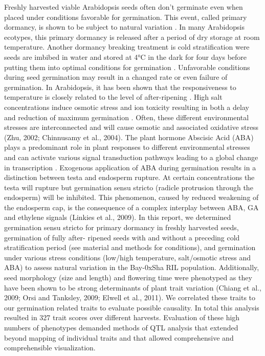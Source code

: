 Freshly harvested viable Arabidopsis seeds often don't germinate even when placed under conditions 
favorable for germination. This event, called primary dormancy, is shown to be subject to natural 
variation \cite{Bentsink:2010}. In many Arabidopsis ecotypes, this primary dormancy is released after 
a period of dry storage at room temperature. Another dormancy breaking treatment is cold stratification 
were seeds are imbibed in water and stored at 4°C in the dark for four days before putting them into 
optimal conditions for germination \cite{Finch-Savage:2006}. Unfavorable conditions during seed 
germination may result in a changed rate or even failure of germination. In Arabidopsis, it has been 
shown that the responsiveness to temperature is closely related to the level of after-ripening 
\cite{Tamura:2006}. High salt concentrations induce osmotic stress and ion toxicity resulting in both 
a delay and reduction of maximum germination \cite{Galpaz:2010}. Often, these different environmental 
stresses are interconnected and will cause osmotic and associated oxidative stress (Zhu, 2002; 
Chinnusamy et al., 2004). The plant hormone Abscisic Acid (ABA) plays a predominant role in plant 
responses to different environmental stresses and can activate various signal transduction pathways 
leading to a global change in transcription \cite{Finkelstein:2002, Xiong:2002}. Exogenous application 
of ABA during germination results in a distinction between testa and endosperm rupture. At certain 
concentrations the testa will rupture but germination sensu stricto (radicle protrusion through the 
endosperm) will be inhibited. This phenomenon, caused by reduced weakening of the endosperm cap, is 
the consequence of a complex interplay between ABA, GA and ethylene signals (Linkies et al., 2009). 
In this report, we determined germination sensu stricto for primary dormancy in freshly harvested seeds, 
germination of fully after- ripened seeds with and without a preceding cold stratification period 
(see material and methods for conditions), and germination under various stress conditions (low/high 
temperature, salt/osmotic stress and ABA) to assess natural  variation in the Bay-0xSha RIL population. 
Additionally, seed morphology (size and length) and flowering time were phenotyped as they have been 
shown to be strong determinants of plant trait variation (Chiang et al., 2009; Orsi and Tanksley, 
2009; Elwell et al., 2011). We correlated these traits to our germination related traits to evaluate 
possible causality. In total this analysis resulted in 327 trait scores over different harvests. 
Evaluation of these high numbers of phenotypes demanded methods of QTL analysis that extended beyond 
mapping of individual traits and that allowed comprehensive and comprehensible visualization.

